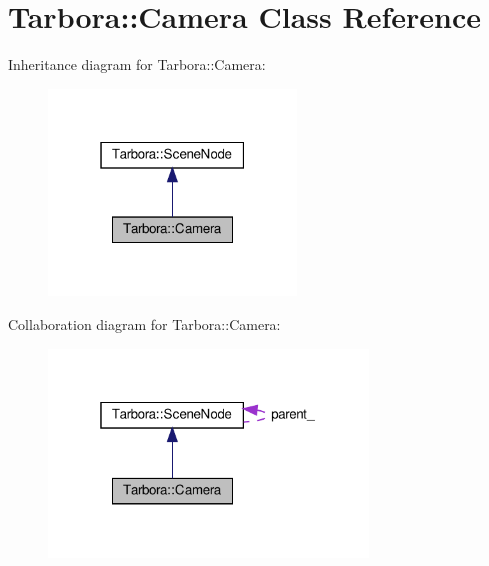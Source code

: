 \hypertarget{classTarbora_1_1Camera}{}\section{Tarbora\+:\+:Camera Class Reference}
\label{classTarbora_1_1Camera}


Inheritance diagram for Tarbora\+:\+:Camera\+:
\nopagebreak
\begin{figure}[H]
\begin{center}
\leavevmode
\includegraphics[width=187pt]{classTarbora_1_1Camera__inherit__graph}
\end{center}
\end{figure}


Collaboration diagram for Tarbora\+:\+:Camera\+:
\nopagebreak
\begin{figure}[H]
\begin{center}
\leavevmode
\includegraphics[width=241pt]{classTarbora_1_1Camera__coll__graph}
\end{center}
\end{figure}
